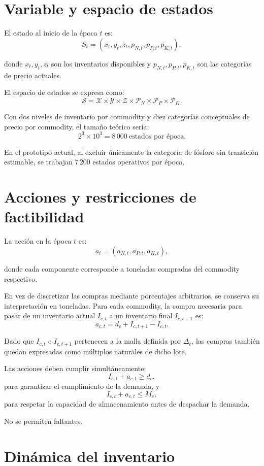 \documentclass[11pt]{article}
\begin{document}
\section{Variable y espacio de estados}

El estado al inicio de la época $t$ es:
\[
S_t=(x_t,y_t,z_t,p_{N,t},p_{P,t},p_{K,t}),
\]

donde $x_t,y_t,z_t$ son los inventarios disponibles y $p_{N,t},p_{P,t},p_{K,t}$ son las categorías de precio actuales.

El espacio de estados se expresa como:
\[
\mathcal{S}=\mathcal{X}\times\mathcal{Y}\times\mathcal{Z}\times\mathcal{P}_N\times\mathcal{P}_P\times\mathcal{P}_K.
\]

Con dos niveles de inventario por commodity y diez categorías conceptuales de precio por commodity, el tamaño teórico sería:
\[
2^3\times10^3=8\,000\ \text{estados por época}.
\]

En el prototipo actual, al excluir únicamente la categoría de fósforo sin transición estimable, se trabajan $7\,200$ estados operativos por época.

\section{Acciones y restricciones de factibilidad}

La acción en la época $t$ es:
\[
a_t=(a_{N,t},a_{P,t},a_{K,t}),
\]

donde cada componente corresponde a toneladas compradas del commodity respectivo.

En vez de discretizar las compras mediante porcentajes arbitrarios, se conserva su interpretación en toneladas. Para cada commodity, la compra necesaria para pasar de un inventario actual $I_{c,t}$ a un inventario final $I_{c,t+1}$ es:
\[
a_{c,t}=d_c+I_{c,t+1}-I_{c,t}.
\]

Dado que $I_{c,t}$ e $I_{c,t+1}$ pertenecen a la malla definida por $\Delta_c$, las compras también quedan expresadas como múltiplos naturales de dicho lote.

Las acciones deben cumplir simultáneamente:
\[
I_{c,t}+a_{c,t}\ge d_c,
\]
para garantizar el cumplimiento de la demanda, y
\[
I_{c,t}+a_{c,t}\le M_c,
\]
para respetar la capacidad de almacenamiento antes de despachar la demanda.

No se permiten faltantes.

\section{Dinámica del inventario}
\end{document}
